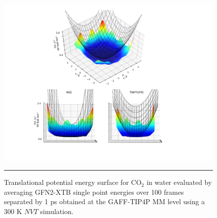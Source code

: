 \documentclass[../main.tex]{subfiles}
\begin{document}
\begin{figure}[h!]
	\vspace{0.2cm}
	\centering
	\includegraphics[width=14cm]{4/figs/figX4/figX4.pdf}
	\vspace{0.2cm}
	\hrule
	\caption{Translational potential energy surface for CO$_2$ in water evaluated by averaging GFN2-XTB single point energies over 100 frames separated by 1 ps obtained at the GAFF-TIP4P MM level using a 300 K $NVT$ simulation.} 
	\label{fig::2d_co2_in_h2o_mm_xtb}
\end{figure}

\end{document}
